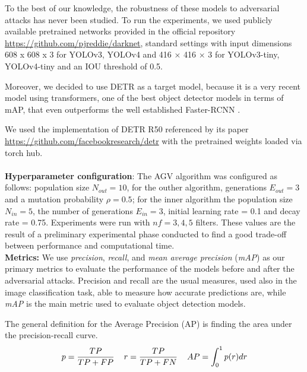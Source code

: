To the best of our knowledge, the robustness of these models to adversarial attacks has never been studied. To run the experiments, we used publicly available pretrained networks provided in the official repository
\url{https://github.com/pjreddie/darknet}, standard settings with input dimensions 608 x 608 x 3 for YOLOv3, YOLOv4 and 416 × 416 × 3 for YOLOv3-tiny, YOLOv4-tiny and an IOU threshold of 0.5. 

Moreover, we decided to use DETR as a target model, because it is a very recent model using transformers, one of the best object detector models in terms of mAP, that even outperforms the well established Faster-RCNN \cite{detr_paper}.

We used the implementation of DETR R50 referenced by its paper \url{https://github.com/facebookresearch/detr} with the pretrained weights loaded via torch hub.\\
\\

\noindent \textbf{Hyperparameter configuration}: 
The AGV algorithm was configured as follows: population size $N_{out}=10$, for the outher algorithm, generations $E_{out}=3$ and a mutation probability $\rho= 0.5$; for the inner algorithm the population size $N_{in}=5$, the number of generations $E_{in}=3$, initial learning rate = 0.1 and decay rate = 0.75. Experiments were run with $nf = 3,4,5$ filters.  These values are the result of a preliminary experimental phase conducted  to find a good trade-off between performance and computational time.\\

\noindent \textbf{Metrics:}
We use \textit{precision}, \textit{recall}, and \textit{mean average precision} (\textit{mAP}) as our primary metrics to evaluate the performance of the models before and after the adversarial attacks.
Precision and recall are the usual measures, used also in the image classification task, able to measure how accurate predictions are, while 
\textit{mAP} is the main metric used to evaluate object detection models.

The general definition for the Average Precision (AP) is finding the area under the precision-recall curve.
\begin{equation}
p = \frac{TP}{TP+FP} \hspace{0.4cm}
r = \frac{TP}{TP+FN} \hspace{0.4cm}
AP= \int_{0}^{1} p(r)dr
\end{equation}

